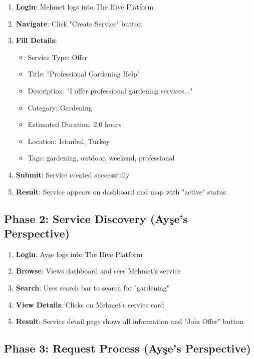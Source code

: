 \documentclass[12pt,a4paper]{report}
\begin{document}
\begin{enumerate}
    \item \textbf{Login}: Mehmet logs into The Hive Platform
    \item \textbf{Navigate}: Click "Create Service" button
    \item \textbf{Fill Details}:
          \begin{itemize}
              \item Service Type: Offer
              \item Title: "Professional Gardening Help"
              \item Description: "I offer professional gardening services..."
              \item Category: Gardening
              \item Estimated Duration: 2.0 hours
              \item Location: Istanbul, Turkey
              \item Tags: gardening, outdoor, weekend, professional
          \end{itemize}
    \item \textbf{Submit}: Service created successfully
    \item \textbf{Result}: Service appears on dashboard and map with "active" status
\end{enumerate}

\subsection{Phase 2: Service Discovery (Ayşe's Perspective)}

\begin{enumerate}
    \item \textbf{Login}: Ayşe logs into The Hive Platform
    \item \textbf{Browse}: Views dashboard and sees Mehmet's service
    \item \textbf{Search}: Uses search bar to search for "gardening"
    \item \textbf{View Details}: Clicks on Mehmet's service card
    \item \textbf{Result}: Service detail page shows all information and "Join Offer" button
\end{enumerate}

\subsection{Phase 3: Request Process (Ayşe's Perspective)}
\end{document}
